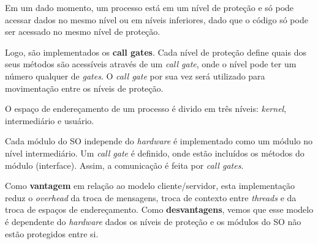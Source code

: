 Em um dado momento, um processo está em um nível de proteção e só pode acessar dados no mesmo nível ou em níveis inferiores, dado que o código só pode ser acessado no mesmo nível de proteção.

Logo, são implementados os \textbf{call gates}. Cada nível de proteção define quais dos seus métodos são acessíveis através de um \textit{call gate}, onde o nível pode ter um número qualquer de \textit{gates}. O \textit{call gate} por sua vez será utilizado para movimentação entre os níveis de proteção.

O espaço de endereçamento de um processo é divido em três níveis: \textit{kernel}, intermediário e usuário.

Cada módulo do SO independe do \textit{hardware} é implementado como um módulo no nível intermediário. Um \textit{call gate} é definido, onde estão incluídos os métodos do módulo (interface). Assim, a comunicação é feita por \textit{call gates}.

Como \textbf{vantagem} em relação ao modelo cliente/servidor, esta implementação reduz o \textit{overhead} da troca de mensagens, troca de contexto entre \textit{threads} e da troca de espaços de endereçamento. Como \textbf{desvantagens}, vemos que esse modelo é dependente do \textit{hardware} dados os níveis de proteção e os módulos do SO não estão protegidos entre si.
